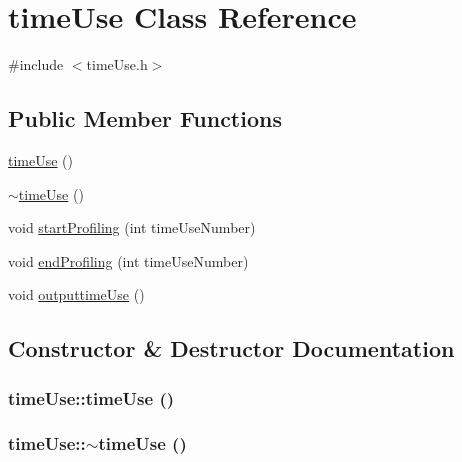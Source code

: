 \hypertarget{classtime_use}{
\section{timeUse Class Reference}
\label{classtime_use}
}


{\ttfamily \#include $<$timeUse.h$>$}\subsection*{Public Member Functions}
\begin{DoxyCompactItemize}
\item 
\hyperlink{classtime_use_a19987769dfc6bd8e7ac5f315805a1ba2}{timeUse} ()
\item 
\hyperlink{classtime_use_a9701b0f8549a9ef1ad2a48955be05a54}{$\sim$timeUse} ()
\item 
void \hyperlink{classtime_use_af0e1376944bfc9ef67c9c9e8569d703a}{startProfiling} (int timeUseNumber)
\item 
void \hyperlink{classtime_use_aade844e77b4179335dfccda884ee5f04}{endProfiling} (int timeUseNumber)
\item 
void \hyperlink{classtime_use_a25cdeb0324880ab8260a6e97d56dd2d8}{outputtimeUse} ()
\end{DoxyCompactItemize}


\subsection{Constructor \& Destructor Documentation}
\hypertarget{classtime_use_a19987769dfc6bd8e7ac5f315805a1ba2}{
\subsubsection[{timeUse}]{\setlength{\rightskip}{0pt plus 5cm}timeUse::timeUse ()}}
\label{classtime_use_a19987769dfc6bd8e7ac5f315805a1ba2}
\hypertarget{classtime_use_a9701b0f8549a9ef1ad2a48955be05a54}{
\subsubsection[{$\sim$timeUse}]{\setlength{\rightskip}{0pt plus 5cm}timeUse::$\sim$timeUse ()}}
\label{classtime_use_a9701b0f8549a9ef1ad2a48955be05a54}


